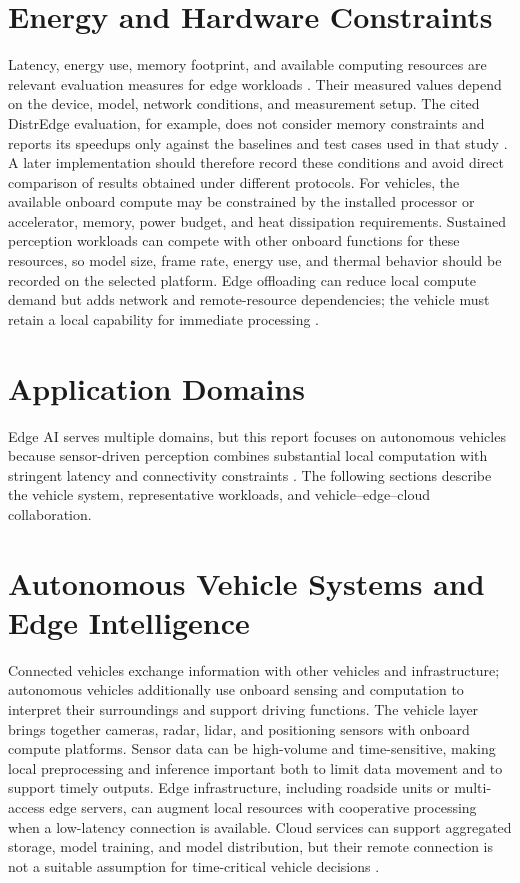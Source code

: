 \documentclass[12pt,a4paper,oneside]{report}
\begin{document}
\section{Energy and Hardware Constraints}

Latency, energy use, memory footprint, and available computing resources
are relevant evaluation measures for edge workloads \cite{deng2020,hou2022}.
Their measured values depend on the device, model, network conditions, and
measurement setup. The cited DistrEdge evaluation, for example, does not
consider memory constraints and reports its speedups only against the
baselines and test cases used in that study \cite{hou2022}. A later
implementation should therefore record these conditions and avoid direct
comparison of results obtained under different protocols.
For vehicles, the available onboard compute may be constrained by the
installed processor or accelerator, memory, power budget, and heat
dissipation requirements. Sustained perception workloads can compete with
other onboard functions for these resources, so model size, frame rate,
energy use, and thermal behavior should be recorded on the selected
platform. Edge offloading can reduce local compute demand but adds network
and remote-resource dependencies; the vehicle must retain a local
capability for immediate processing \cite{biswas2023}.

\section{Application Domains}

Edge AI serves multiple domains, but this report focuses on autonomous
vehicles because sensor-driven perception combines substantial local
computation with stringent latency and connectivity constraints
\cite{biswas2023}. The following sections describe the vehicle system,
representative workloads, and vehicle--edge--cloud collaboration.

\section{Autonomous Vehicle Systems and Edge Intelligence}

Connected vehicles exchange information with other vehicles and
infrastructure; autonomous vehicles additionally use onboard sensing and
computation to interpret their surroundings and support driving functions.
The vehicle layer brings together cameras, radar, lidar, and positioning
sensors with onboard compute platforms. Sensor data can be high-volume and
time-sensitive, making local preprocessing and inference important both to
limit data movement and to support timely outputs. Edge infrastructure,
including roadside units or multi-access edge servers, can augment local
resources with cooperative processing when a low-latency connection is
available. Cloud services can support aggregated storage, model training,
and model distribution, but their remote connection is not a suitable
assumption for time-critical vehicle decisions \cite{biswas2023,deng2020}.
\end{document}
